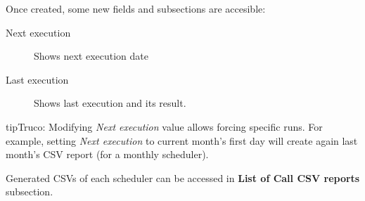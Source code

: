\documentclass[letterpaper,10pt,spanish]{sphinxmanual}
\begin{document}
Once created, some new fields and subsections are accesible:
\begin{description}
\item[{Next execution}] \leavevmode{}\label{administration_portal/client/vpbx/calls/call_csv_schedulers:term-next-execution}
Shows next execution date

\item[{Last execution}] \leavevmode{}\label{administration_portal/client/vpbx/calls/call_csv_schedulers:term-last-execution}
Shows last execution and its result.

\end{description}

\begin{notice}{tip}{Truco:}
Modifying \emph{Next execution} value allows forcing specific runs. For example, setting \emph{Next execution} to
current month's first day will create again last month's CSV report (for a monthly scheduler).
\end{notice}

Generated CSVs of each scheduler can be accessed in \textbf{List of Call CSV reports} subsection.
\end{document}
